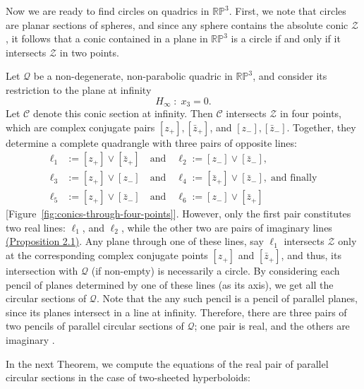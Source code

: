 \documentclass[10pt, a4paper]{article}
\theoremstyle{BoldTopSpacing}
\theoremstyle{BoldTopSpacing}
\theoremstyle{BoldTopSpacing}
\theoremstyle{BoldTopBottomSpacing}
\theoremstyle{BoldTopSpacing}
\theoremstyle{BoldTopBottomSpacing}
\theoremstyle{remark}
\begin{document}
Now we are ready to find circles on quadrics in $\mathbb{R}\mathbb{P}^3$. First, we note that circles are planar sections of spheres, and since any sphere contains the absolute conic $\mathcal{Z}$, it follows that a conic contained in a plane in $\mathbb{R}\mathbb{P}^3$ is a circle if and only if it intersects $\mathcal{Z}$ in two points. \par
Let $\mathcal{Q}$ be a non-degenerate, non-parabolic quadric in $\mathbb{R}\mathbb{P}^3$, and consider its restriction to the plane at infinity
\[
    H_{\infty} \; : \; x_{3} = 0.
\]
Let $\mathcal{C}$ denote this conic section at infinity. Then $\mathcal{C}$ intersects $\mathcal{Z}$ in four points, which are complex conjugate pairs $[z_{+}], [\bar{z}_{+}]$, and $[z_{-}], [\bar{z}_{-}]$. Together, they determine a complete quadrangle with three pairs of opposite lines:
\begin{align*}
    \ell_{1} &:= [z_{+}] \vee [\bar{z}_{+}] \quad \text{and} \quad \ell_{2} := [z_{-}] \vee [\bar{z}_{-}], \\
    \ell_{3} &:= [z_{+}] \vee [z_{-}] \quad \text{and} \quad \ell_{4} := [\bar{z}_{+}] \vee [\bar{z}_{-}], \; \text{and finally} \\
    \ell_{5} &:= [z_{+}] \vee [\bar{z}_{-}] \quad \text{and} \quad \ell_{6} :=  [z_{-}] \vee [\bar{z}_{+}]
\end{align*}
[Figure~\ref{fig:conics-through-four-points}]. However, only the first pair constitutes two real lines: $\ell_{1}$, and $\ell_{2}$, while the other two are pairs of imaginary lines \hyperref[thm:span-real-line]{(Proposition 2.1)}. Any plane through one of these lines, say $\ell_{1}$ intersects $\mathcal{Z}$ only at the corresponding complex conjugate points $[z_{+}]$ and $[\bar{z}_{+}]$, and thus, its intersection with $\mathcal{Q}$ (if non-empty) is necessarily a circle. By considering each pencil of planes determined by one of these lines (as its axis), we get all the circular sections of $\mathcal{Q}$. Note that the any such pencil is a pencil of parallel planes, since its planes intersect in a line at infinity. Therefore, there are three pairs of two pencils of parallel circular sections of $\mathcal{Q}$; one pair is real, and the others are imaginary \cite[\textcolor{CitationColor}{p.~204--205}]{sommervilleAnalyticalGeometry}. \par

In the next Theorem, we compute the equations of the real pair of parallel circular sections in the case of two-sheeted hyperboloids:
\end{document}
